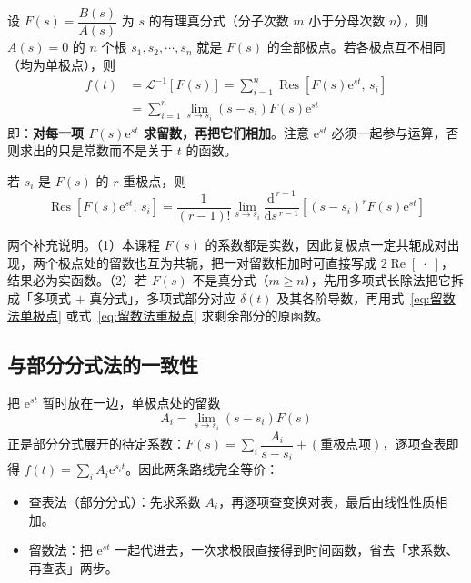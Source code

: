 \begin{keybox}[留数法基本公式]
设 $F(s)=\dfrac{B(s)}{A(s)}$ 为 $s$ 的有理真分式（分子次数 $m$ 小于分母次数 $n$），则 $A(s)=0$ 的 $n$ 个根 $s_1,s_2,\cdots,s_n$ 就是 $F(s)$ 的全部极点。若各极点互不相同（均为单极点），则
\begin{equation}
\begin{aligned}
f(t)&=\mathcal{L}^{-1}\left[F(s)\right]=\sum_{i=1}^{n}\operatorname{Res}\left[F(s)\mathrm{e}^{st},\,s_i\right]\\
&=\sum_{i=1}^{n}\lim_{s\to s_i}(s-s_i)F(s)\mathrm{e}^{st}
\end{aligned}
\label{eq:留数法单极点}
\end{equation}
即：\textbf{对每一项 $F(s)\mathrm{e}^{st}$ 求留数，再把它们相加}。注意 $\mathrm{e}^{st}$ 必须一起参与运算，否则求出的只是常数而不是关于 $t$ 的函数。
\end{keybox}

\begin{property}[重极点处的留数]
若 $s_i$ 是 $F(s)$ 的 $r$ 重极点，则
\begin{equation}
\operatorname{Res}\left[F(s)\mathrm{e}^{st},\,s_i\right]
=\frac{1}{(r-1)!}\lim_{s\to s_i}\frac{\mathrm{d}^{\,r-1}}{\mathrm{d}s^{\,r-1}}\left[(s-s_i)^{r}F(s)\mathrm{e}^{st}\right]
\label{eq:留数法重极点}
\end{equation}
\end{property}

\begin{note}
两个补充说明。（1）本课程 $F(s)$ 的系数都是实数，因此复极点一定共轭成对出现，两个极点处的留数也互为共轭，把一对留数相加时可直接写成 $2\operatorname{Re}\left[\;\cdot\;\right]$，结果必为实函数。（2）若 $F(s)$ 不是真分式（$m\ge n$），先用多项式长除法把它拆成「多项式 $+$ 真分式」，多项式部分对应 $\delta(t)$ 及其各阶导数，再用式~\eqref{eq:留数法单极点} 或式~\eqref{eq:留数法重极点} 求剩余部分的原函数。
\end{note}

\subsection{与部分分式法的一致性}

把 $\mathrm{e}^{st}$ 暂时放在一边，单极点处的留数
\[
A_i=\lim_{s\to s_i}(s-s_i)F(s)
\]
正是部分分式展开的待定系数：$F(s)=\sum\limits_{i}\dfrac{A_i}{s-s_i}+\left(\text{重极点项}\right)$，逐项查表即得 $f(t)=\sum\limits_{i}A_i\mathrm{e}^{s_it}$。因此两条路线完全等价：

\begin{itemize}
\item 查表法（部分分式）：先求系数 $A_i$，再逐项查变换对表，最后由线性性质相加。
\item 留数法：把 $\mathrm{e}^{st}$ 一起代进去，一次求极限直接得到时间函数，省去「求系数、再查表」两步。
\end{itemize}

